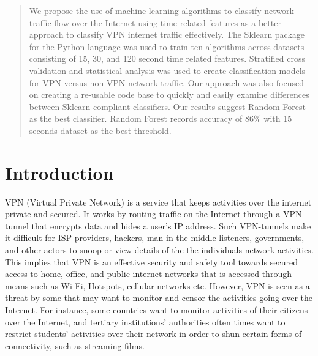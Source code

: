 \documentclass[conference]{IEEEtran}
\begin{document}
\begin{abstract}

We propose the use of machine learning algorithms to classify network traffic flow over the Internet using time-related features as a better approach to classify VPN internet traffic effectively.
The Sklearn package for the Python language was used to train ten algorithms across datasets consisting of 15, 30, and 120 second time related features. Stratified cross validation and statistical analysis was used to create classification models for VPN versus non-VPN network traffic. Our approach was also focused on creating a re-usable code base to quickly and easily examine differences between Sklearn compliant classifiers. Our results suggest Random Forest as the best classifier. Random Forest records accuracy of 86\% with 15 seconds dataset as the best threshold.
\end{abstract}





%
\IEEEpeerreviewmaketitle



\section{Introduction}
VPN (Virtual Private Network) is a service that keeps activities over the internet private and secured. It works by routing traffic on the Internet through a VPN-tunnel that encrypts data and hides a user's IP address. Such VPN-tunnels make it difficult for ISP providers, hackers, man-in-the-middle listeners, governments, and other actors to snoop or view details of the the individuals network activities. This implies that VPN is an effective security and safety tool towards secured access to home, office, and public internet networks that is accessed through means such as Wi-Fi, Hotspots, cellular networks etc. However, VPN is seen as a threat by some that may want to monitor and censor the activities going over the Internet. For instance, some countries want to monitor activities of their citizens over the Internet, and tertiary institutions' authorities often times want to restrict students' activities over their network in order to shun certain forms of connectivity, such as streaming films.
\end{document}
